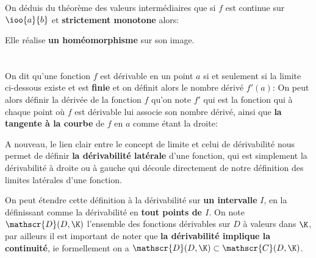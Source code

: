 \subsection*{}
On déduis du théorème des valeurs intermédiaires que si \(f\) est continue sur \(\ioo{a}{b}\) et \textbf{strictement monotone} alors:
\begin{center}
   Elle réalise \textbf{un homéomorphisme} sur son image.
\end{center}
\chapter*{} %

\subsection*{}

On dit qu'une fonction \(f\) est dérivable en un point \(a\) si et seulement si la limite ci-dessous existe et est \textbf{finie} et on définit alors le nombre dérivé \(f'(a)\):
On peut alors définir la dérivée de la fonction \(f\) qu'on note \(f'\)  qui est la fonction qui à chaque point où \(f\) est dérivable lui associe son nombre dérivé, ainsi que \textbf{la tangente à la courbe} de \(f\) en \(a\) comme étant la droite:

A nouveau, le lien clair entre le concept de limite et celui de dérivabilité nous permet de définir \textbf{la dérivabilité latérale} d'une fonction, qui est simplement la dérivabilité à droite ou à gauche qui découle directement de notre définition des limites latérales d'une fonction.\<

On peut étendre cette définition à la dérivabilité sur \textbf{un intervalle} \(I\), en la définissant comme la dérivabilité en \textbf{tout points de \(I\)}.\+
On note \(\mathscr{D}(D, \K)\) l'ensemble des fonctions dérivables sur \(D\) à valeurs dans \(\K\), par ailleurs il est important de noter que \textbf{la dérivabilité implique la continuité}, ie formellement on a \(\mathscr{D}(D, \K) \subset \mathscr{C}(D, \K)\).

\subsection*{}

